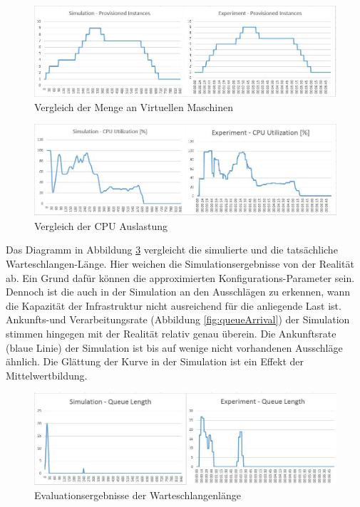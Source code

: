 \begin{figure}[!h]
	\includegraphics[width=\textwidth, trim={0cm 0cm 0cm 0cm}]{img/vms.jpg}
	\caption{Vergleich der Menge an Virtuellen Maschinen}
	\label{fig:vmsResult}
\end{figure}

\begin{figure}[!h]
	\includegraphics[width=\textwidth, trim={0cm 0cm 0cm 0cm}]{img/cpu.jpg}
	\caption{Vergleich der CPU Auslastung}
	\label{fig:cpuResult}
\end{figure}

\noindent
Das Diagramm in Abbildung \ref{fig:queueLength} vergleicht die simulierte und die tatsächliche Warteschlangen-Länge. Hier weichen die Simulationsergebnisse von der Realität ab. Ein Grund dafür können die approximierten Konfigurations-Parameter sein. Dennoch ist die auch in der Simulation an den Ausschlägen zu erkennen, wann die Kapazität der Infrastruktur nicht ausreichend für die anliegende Last ist.\\
Ankunfts-und Verarbeitungsrate (Abbildung \ref{fig:queueArrival}) der Simulation stimmen hingegen mit der Realität relativ genau überein. Die Ankunftsrate (blaue Linie) der Simulation ist bis auf wenige nicht vorhandenen  Ausschläge ähnlich. Die Glättung der Kurve in der Simulation ist ein Effekt der Mittelwertbildung. 



\begin{figure}[!h]
	\includegraphics[width=\textwidth, trim={0cm 0cm 0cm 0cm}]{img/queueLength.jpg}
	\caption{Evaluationsergebnisse der Warteschlangenlänge}
	\label{fig:queueLength}
\end{figure}


